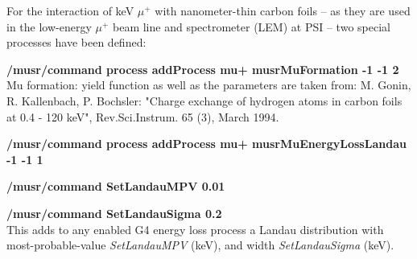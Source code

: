 \documentclass[twoside]{dis04}
\begin{document}
\noindent For the interaction of keV $\mu^+$ with nanometer-thin carbon foils -- as they are used in the
low-energy $\mu^+$ beam line and spectrometer (LEM) at PSI -- two special processes have been
defined:
\begin{description}
\item{\bf /musr/command process addProcess mu+ musrMuFormation -1 -1 2}\\
        Mu formation: yield function as well as the parameters are taken from: M. Gonin, R. Kallenbach, P. Bochsler: "Charge exchange of hydrogen atoms in carbon foils at 0.4 - 120 keV", Rev.Sci.Instrum. 65 (3), March 1994.

\item{\bf /musr/command process addProcess mu+ musrMuEnergyLossLandau   -1  -1 1}
\item{\bf /musr/command SetLandauMPV 0.01}
\item{\bf /musr/command SetLandauSigma 0.2}\\      
      This adds to any enabled G4 energy loss process a Landau distribution with most-probable-value
      \emph{SetLandauMPV} (keV), and width \emph{SetLandauSigma} (keV).



\end{description}

\end{document}
